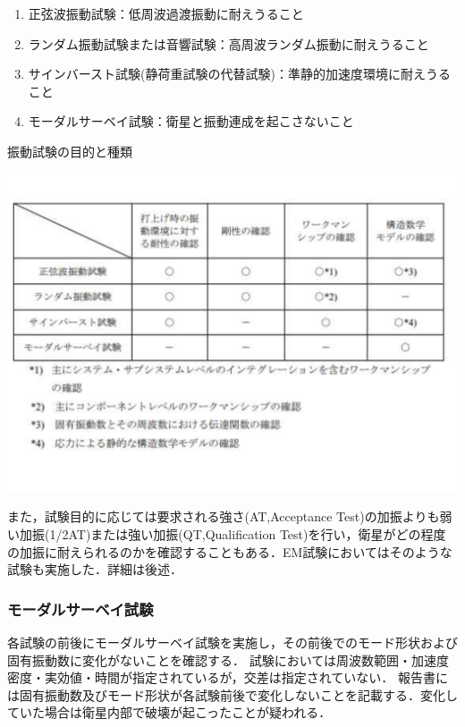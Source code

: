 \begin{enumerate}
	\item 正弦波振動試験：低周波過渡振動に耐えうること
	\item ランダム振動試験または音響試験：高周波ランダム振動に耐えうること
	\item サインバースト試験(静荷重試験の代替試験)：準静的加速度環境に耐えうること
	\item モーダルサーベイ試験：衛星と振動連成を起こさないこと
\end{enumerate}

\begin{table}[H]
	\centering
	\caption{振動試験の目的と種類\cite{vibration_test_handbook}}
	\includegraphics[width=0.9\linewidth]{04/fig/t4-3-2.pdf}
	\label{table4-3-2}
\end{table}


また，試験目的に応じては要求される強さ(AT,Acceptance Test)の加振よりも弱い加振(1/2AT)または強い加振(QT,Qualification Test)を行い，衛星がどの程度の加振に耐えられるのかを確認することもある．EM試験においてはそのような試験も実施した．詳細は後述．

\subsubsection{モーダルサーベイ試験}
各試験の前後にモーダルサーベイ試験を実施し，その前後でのモード形状および固有振動数に変化がないことを確認する．
試験においては周波数範囲・加速度密度・実効値・時間が指定されているが，交差は指定されていない．
報告書には固有振動数及びモード形状が各試験前後で変化しないことを記載する．変化していた場合は衛星内部で破壊が起こったことが疑われる．

